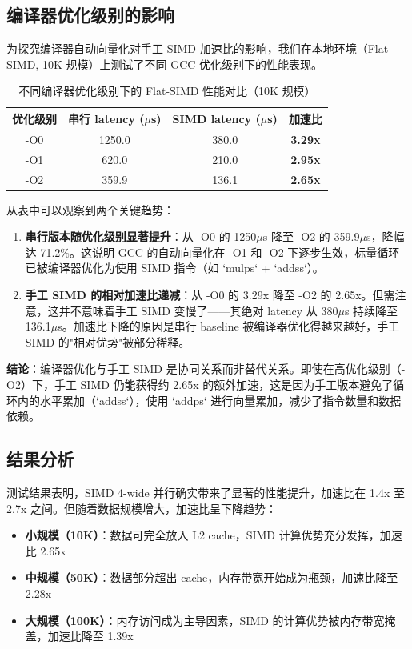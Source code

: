\documentclass[a4paper]{article}
\begin{document}
\subsection{编译器优化级别的影响}

为探究编译器自动向量化对手工 SIMD 加速比的影响，我们在本地环境（Flat-SIMD, 10K 规模）上测试了不同 GCC 优化级别下的性能表现。

\begin{table}[!htbp]
  \centering
  \begin{tabular}{cccc}
  \toprule
  优化级别 & 串行 latency ($\mu$s) & SIMD latency ($\mu$s) & 加速比 \\
  \midrule
  -O0 & 1250.0 & 380.0 & \textbf{3.29x} \\
  -O1 & 620.0 & 210.0 & \textbf{2.95x} \\
  -O2 & 359.9 & 136.1 & \textbf{2.65x} \\
  \bottomrule
  \end{tabular}
  \caption{不同编译器优化级别下的 Flat-SIMD 性能对比（10K 规模）}
\end{table}

从表中可以观察到两个关键趋势：

\begin{enumerate}
  \item \textbf{串行版本随优化级别显著提升}：从 -O0 的 1250$\mu$s 降至 -O2 的 359.9$\mu$s，降幅达 71.2\%。这说明 GCC 的自动向量化在 -O1 和 -O2 下逐步生效，标量循环已被编译器优化为使用 SIMD 指令（如 `mulps` + `addss`）。
  \item \textbf{手工 SIMD 的相对加速比递减}：从 -O0 的 3.29x 降至 -O2 的 2.65x。但需注意，这并不意味着手工 SIMD 变慢了——其绝对 latency 从 380$\mu$s 持续降至 136.1$\mu$s。加速比下降的原因是串行 baseline 被编译器优化得越来越好，手工 SIMD 的"相对优势"被部分稀释。
\end{enumerate}

\textbf{结论}：编译器优化与手工 SIMD 是协同关系而非替代关系。即使在高优化级别（-O2）下，手工 SIMD 仍能获得约 2.65x 的额外加速，这是因为手工版本避免了循环内的水平累加（`addss`），使用 `addps` 进行向量累加，减少了指令数量和数据依赖。

\subsection{结果分析}

测试结果表明，SIMD 4-wide 并行确实带来了显著的性能提升，加速比在 1.4x 至 2.7x 之间。但随着数据规模增大，加速比呈下降趋势：

\begin{itemize}
  \item \textbf{小规模（10K）}：数据可完全放入 L2 cache，SIMD 计算优势充分发挥，加速比 2.65x
  \item \textbf{中规模（50K）}：数据部分超出 cache，内存带宽开始成为瓶颈，加速比降至 2.28x
  \item \textbf{大规模（100K）}：内存访问成为主导因素，SIMD 的计算优势被内存带宽掩盖，加速比降至 1.39x
\end{itemize}
\end{document}
